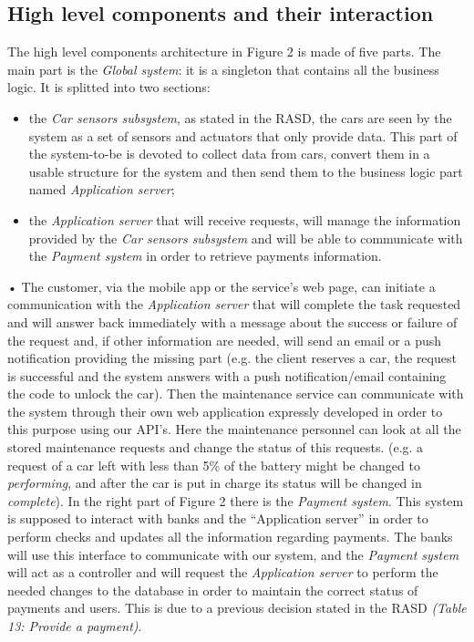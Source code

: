 \documentclass[10pt, a4paper,titlepage]{article}
\begin{document}
\subsection{High level components and their interaction}
The high level components architecture in Figure 2 is made of five parts. The main part is the \emph{Global system}: it is a singleton that contains all the business logic. It is splitted into two sections: 
\begin{itemize}
\item the \emph{Car sensors subsystem}, as stated in the RASD, the cars are seen by the system as a set of sensors and actuators that only provide data. This part of the system-to-be is devoted to collect data from cars, convert them in a usable structure for the system and then send them to the business logic part named \emph{Application server};
\item the \emph{Application server} that will receive requests, will manage the information provided by the \emph{Car sensors subsystem} and will be able to communicate with the \emph{Payment system} in order to retrieve payments information.
\end{itemize}•
The customer, via the mobile app or the service’s web page, can initiate a communication with the \emph{Application server} that will complete the task requested and will answer back immediately with a message about the success or failure of the request and, if other information are needed, will send an email or a push notification providing the missing part (e.g. the client reserves a car, the request is successful and the system answers with a push notification/email containing the code to unlock the car).
Then the maintenance service can communicate with the system through their own web application expressly developed in order to this purpose using our API's. Here the maintenance personnel can look at all the stored maintenance requests and change the status of this requests. (e.g. a request of a car left with less than 5\% of the battery might be changed to \textit{performing}, and after the car is put in charge its status will be changed in \textit{complete}).
In the right part of Figure 2 there is the \emph{Payment system}. This system is supposed to interact with banks and the “Application server” in order to perform checks and updates all the information regarding payments. The banks will use this interface to communicate with our system, and the \emph{Payment system} will act as a controller and will request the \emph{Application server} to perform the needed changes to the database in order to maintain the correct status of payments and users. This is due to a previous decision stated in the RASD \textit{(Table 13: Provide a payment)}.
\end{document}
